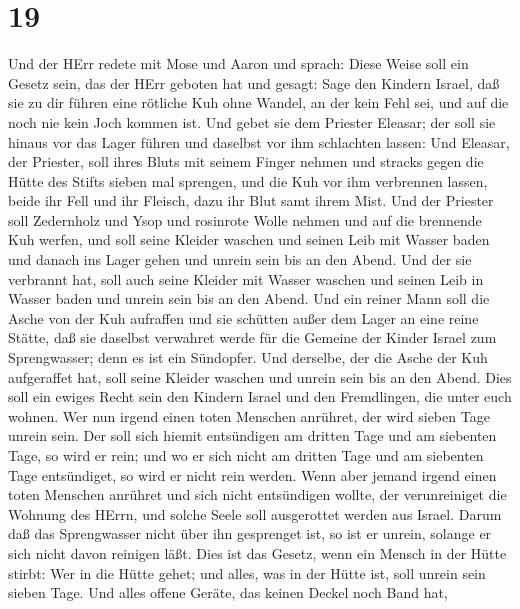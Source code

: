 \hypertarget{section-18}{%
\section{19}\label{section-18}}

 Und der HErr redete mit Mose und Aaron und sprach:
 Diese Weise soll ein Gesetz sein, das der HErr geboten hat
und gesagt: Sage den Kindern Israel, daß sie zu dir führen eine rötliche
Kuh ohne Wandel, an der kein Fehl sei, und auf die noch nie kein Joch
kommen ist.  Und gebet sie dem Priester Eleasar; der soll
sie hinaus vor das Lager führen und daselbst vor ihm schlachten lassen:
 Und Eleasar, der Priester, soll ihres Bluts mit seinem
Finger nehmen und stracks gegen die Hütte des Stifts sieben mal
sprengen,  und die Kuh vor ihm verbrennen lassen, beide ihr
Fell und ihr Fleisch, dazu ihr Blut samt ihrem Mist.  Und
der Priester soll Zedernholz und Ysop und rosinrote Wolle nehmen und auf
die brennende Kuh werfen,  und soll seine Kleider waschen
und seinen Leib mit Wasser baden und danach ins Lager gehen und unrein
sein bis an den Abend.  Und der sie verbrannt hat, soll auch
seine Kleider mit Wasser waschen und seinen Leib in Wasser baden und
unrein sein bis an den Abend.  Und ein reiner Mann soll die
Asche von der Kuh aufraffen und sie schütten außer dem Lager an eine
reine Stätte, daß sie daselbst verwahret werde für die Gemeine der
Kinder Israel zum Sprengwasser; denn es ist ein Sündopfer. 
Und derselbe, der die Asche der Kuh aufgeraffet hat, soll seine Kleider
waschen und unrein sein bis an den Abend. Dies soll ein ewiges Recht
sein den Kindern Israel und den Fremdlingen, die unter euch wohnen.
 Wer nun irgend einen toten Menschen anrühret, der wird
sieben Tage unrein sein.  Der soll sich hiemit entsündigen
am dritten Tage und am siebenten Tage, so wird er rein; und wo er sich
nicht am dritten Tage und am siebenten Tage entsündiget, so wird er
nicht rein werden.  Wenn aber jemand irgend einen toten
Menschen anrühret und sich nicht entsündigen wollte, der verunreiniget
die Wohnung des HErrn, und solche Seele soll ausgerottet werden aus
Israel. Darum daß das Sprengwasser nicht über ihn gesprenget ist, so ist
er unrein, solange er sich nicht davon reinigen läßt.  Dies
ist das Gesetz, wenn ein Mensch in der Hütte stirbt: Wer in die Hütte
gehet; und alles, was in der Hütte ist, soll unrein sein sieben Tage.
 Und alles offene Geräte, das keinen Deckel noch Band hat,
